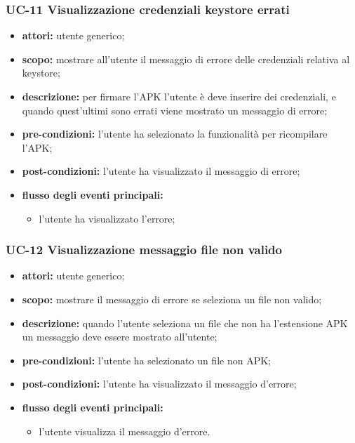 \subsubsection{UC-11 Visualizzazione credenziali keystore errati}\label{subsubsec:uc-11-visualizzazione-credenziali-keystore-errati}
\begin{itemize}
    \item \textbf{attori:} utente generico;
    \item \textbf{scopo:}  mostrare all'utente il messaggio di errore delle credenziali relativa al keystore;
    \item \textbf{descrizione:} per firmare l'APK l'utente è deve inserire dei credenziali, e quando quest'ultimi sono errati viene mostrato un messaggio di errore;
    \item \textbf{pre-condizioni:} l'utente ha selezionato la funzionalità per ricompilare l'APK;
    \item \textbf{post-condizioni:} l'utente ha visualizzato il messaggio di errore;
    \item \textbf{flusso degli eventi principali:}
    \begin{itemize}
        \item l'utente ha visualizzato l'errore;
    \end{itemize}
\end{itemize}

\subsubsection{UC-12 Visualizzazione messaggio file non valido}\label{subsubsec:uc-12-visualizzazione-messaggio-file-non-valido}
\begin{itemize}
    \item \textbf{attori:} utente generico;
    \item \textbf{scopo:} mostrare il messaggio di errore se seleziona un file non valido;
    \item \textbf{descrizione:} quando l'utente seleziona un file che non ha l'estensione APK un messaggio deve essere mostrato all'utente;
    \item \textbf{pre-condizioni:} l'utente ha selezionato un file non APK;
    \item \textbf{post-condizioni:} l'utente ha visualizzato il messaggio d'errore;
    \item \textbf{flusso degli eventi principali:}
    \begin{itemize}
        \item l'utente visualizza il messaggio d'errore.
    \end{itemize}
\end{itemize}
